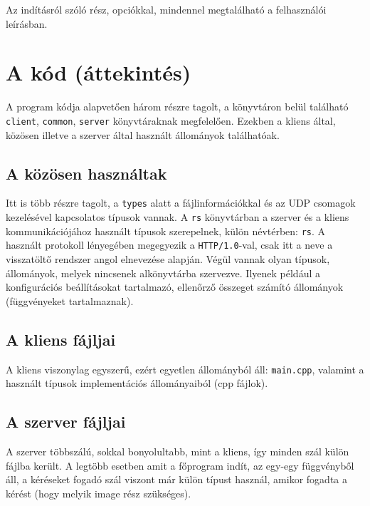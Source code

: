 \documentclass[fleqn,10pt,a4paper,titlepage]{article}
\begin{document}
  Az indításról szóló rész, opciókkal, mindennel megtalálható a felhasználói leírásban.

  \section{A kód (áttekintés)}
  A program kódja alapvetően három részre tagolt, a  könyvtáron belül található \texttt{client},
  \texttt{common}, \texttt{server} könyvtáraknak megfelelően. Ezekben a kliens által, közösen illetve a szerver által
  használt állományok találhatóak.

  \subsection{A közösen használtak}
  Itt is több részre tagolt, a \texttt{types} alatt a fájlinformációkkal és az UDP csomagok kezelésével
  kapcsolatos típusok vannak. A \texttt{rs} könyvtárban a szerver és a kliens kommunikációjához használt típusok
  szerepelnek, külön névtérben: \texttt{rs}. A használt protokoll lényegében megegyezik a \texttt{HTTP/1.0}-val, csak
  itt  a neve a visszatöltő rendszer angol elnevezése alapján. Végül vannak olyan típusok, állományok, melyek
  nincsenek alkönyvtárba szervezve. Ilyenek például a konfigurációs beállításokat tartalmazó, ellenőrző összeget számító
  állományok (függvényeket tartalmaznak).
  
  \subsection{A kliens fájljai}
  A kliens viszonylag egyszerű, ezért egyetlen állományból áll: \texttt{main.cpp}, valamint a használt típusok
  implementációs állományaiból (cpp fájlok).

  \subsection{A szerver fájljai}
  A szerver többszálú, sokkal bonyolultabb, mint a kliens, így minden szál külön fájlba került. A legtöbb esetben amit a
  főprogram indít, az egy-egy függvényből áll, a kéréseket fogadó szál viszont már külön típust használ, amikor fogadta
  a kérést (hogy melyik image rész szükséges).
  
  
  
  
\end{document}
